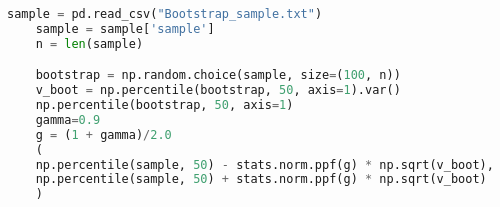 \begin{lstlisting}[language=Python]
	sample = pd.read_csv("Bootstrap_sample.txt")
	sample = sample['sample']
	n = len(sample)

	bootstrap = np.random.choice(sample, size=(100, n))
	v_boot = np.percentile(bootstrap, 50, axis=1).var()
	np.percentile(bootstrap, 50, axis=1)
	gamma=0.9
	g = (1 + gamma)/2.0
	(
    np.percentile(sample, 50) - stats.norm.ppf(g) * np.sqrt(v_boot),
    np.percentile(sample, 50) + stats.norm.ppf(g) * np.sqrt(v_boot)
	)
\end{lstlisting}















